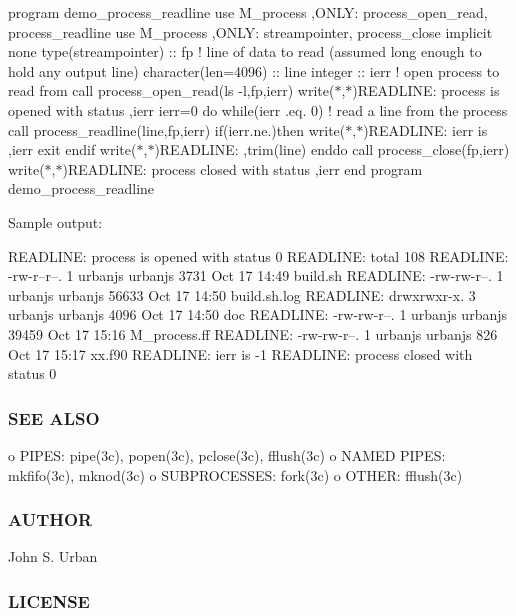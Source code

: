 program demo\+\_\+process\+\_\+readline use M\+\_\+process ,O\+N\+LY\+: process\+\_\+open\+\_\+read, process\+\_\+readline use M\+\_\+process ,O\+N\+LY\+: streampointer, process\+\_\+close implicit none type(streampointer) \+:\+: fp ! line of data to read (assumed long enough to hold any output line) character(len=4096) \+:\+: line integer \+:\+: ierr ! open process to read from call process\+\_\+open\+\_\+read(\textquotesingle{}ls -\/l\textquotesingle{},fp,ierr) write($\ast$,$\ast$)\textquotesingle{}R\+E\+A\+D\+L\+I\+NE\+: process is opened with status \textquotesingle{},ierr ierr=0 do while(ierr .eq. 0) ! read a line from the process call process\+\_\+readline(line,fp,ierr) if(ierr.\+ne.)then write($\ast$,$\ast$)\textquotesingle{}R\+E\+A\+D\+L\+I\+NE\+: ierr is \textquotesingle{},ierr exit endif write($\ast$,$\ast$)\textquotesingle{}R\+E\+A\+D\+L\+I\+NE\+: \textquotesingle{},trim(line) enddo call process\+\_\+close(fp,ierr) write($\ast$,$\ast$)\textquotesingle{}R\+E\+A\+D\+L\+I\+NE\+: process closed with status \textquotesingle{},ierr end program demo\+\_\+process\+\_\+readline

Sample output\+:

R\+E\+A\+D\+L\+I\+NE\+: process is opened with status 0 R\+E\+A\+D\+L\+I\+NE\+: total 108 R\+E\+A\+D\+L\+I\+NE\+: -\/rw-\/r--r--. 1 urbanjs urbanjs 3731 Oct 17 14\+:49 build.\+sh R\+E\+A\+D\+L\+I\+NE\+: -\/rw-\/rw-\/r--. 1 urbanjs urbanjs 56633 Oct 17 14\+:50 build.\+sh.\+log R\+E\+A\+D\+L\+I\+NE\+: drwxrwxr-\/x. 3 urbanjs urbanjs 4096 Oct 17 14\+:50 doc R\+E\+A\+D\+L\+I\+NE\+: -\/rw-\/rw-\/r--. 1 urbanjs urbanjs 39459 Oct 17 15\+:16 M\+\_\+process.\+ff R\+E\+A\+D\+L\+I\+NE\+: -\/rw-\/rw-\/r--. 1 urbanjs urbanjs 826 Oct 17 15\+:17 xx.\+f90 R\+E\+A\+D\+L\+I\+NE\+: ierr is -\/1 R\+E\+A\+D\+L\+I\+NE\+: process closed with status 0

\subsubsection*{S\+EE A\+L\+SO}

o P\+I\+P\+ES\+: pipe(3c), popen(3c), pclose(3c), fflush(3c) o N\+A\+M\+ED P\+I\+P\+ES\+: mkfifo(3c), mknod(3c) o S\+U\+B\+P\+R\+O\+C\+E\+S\+S\+ES\+: fork(3c) o O\+T\+H\+ER\+: fflush(3c) \subsubsection*{A\+U\+T\+H\+OR}

John S. Urban \subsubsection*{L\+I\+C\+E\+N\+SE}

